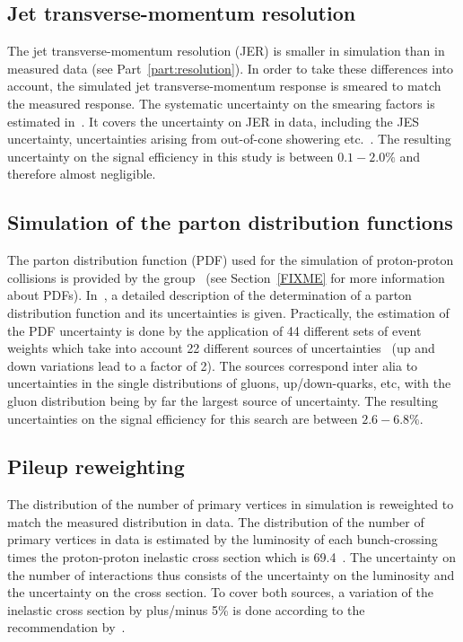 \subsection*{Jet transverse-momentum resolution}
The jet transverse-momentum resolution (JER) is smaller in simulation than in measured data (see Part~\ref{part:resolution}). 
In order to take these differences into account, the simulated jet transverse-momentum response is smeared to match the measured response.
The systematic uncertainty on the smearing factors is estimated in~\cite{bib:CMS:JME_PAS,bib:Kristin_Thesis}.
It covers the uncertainty on JER in data, including the JES uncertainty, uncertainties arising from out-of-cone showering etc.~\cite{bib:CMS:JME_PAS,bib:Kristin_Thesis}.
The resulting uncertainty on the signal efficiency in this study is between $0.1-2.0\%$ and therefore almost negligible.

\subsection*{Simulation of the parton distribution functions}
The parton distribution function (PDF) used for the simulation of proton-proton collisions is provided by the \cteq group~\cite{Pumplin:2002vw} (see Section~\ref{FIXME} for more information about PDFs).
In~\cite{Pumplin:2002vw}, a detailed description of the determination of a parton distribution function and its uncertainties is given.
Practically, the estimation of the PDF uncertainty is done by the application of 44 different sets of event weights which take into account 22 different sources of uncertainties~\cite{Botje:2011sn,bib:PDF_practical} 
(up and down variations lead to a factor of 2).
The sources correspond inter alia to uncertainties in the single distributions of gluons, up/down-quarks, etc, with the gluon distribution being by far the largest source of uncertainty.
The resulting uncertainties on the signal efficiency for this search are between $2.6-6.8\%$.

\subsection*{Pileup reweighting}
The distribution of the number of primary vertices in simulation is reweighted to match the measured distribution in data.
The distribution of the number of primary vertices in data is estimated by the luminosity of each bunch-crossing times the proton-proton inelastic cross section which is 69.4\mb~\cite{bib:CMS:PileupUtilities}.
The uncertainty on the number of interactions thus consists of the uncertainty on the luminosity and the uncertainty on the cross section.
To cover both sources, a variation of the inelastic cross section by plus/minus 5\% is done according to the recommendation by~\cite{bib:CMS:PileupSysUnc}.

